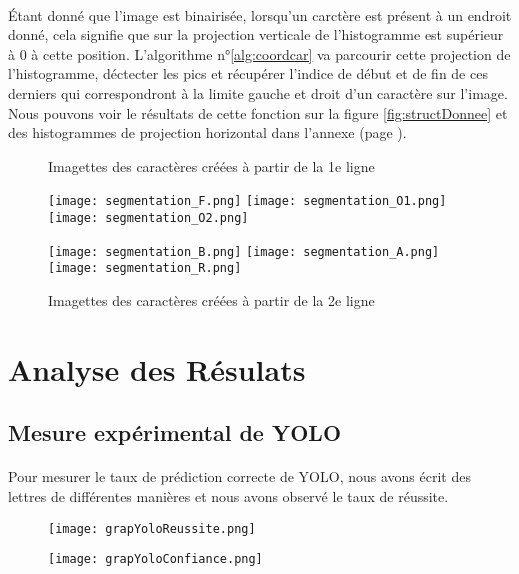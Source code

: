 \documentclass[a4paper]{article}
\begin{document}
			\paragraph{} Étant donné que l'image est binairisée, lorsqu'un carctère est présent à un endroit donné, cela signifie que sur la projection verticale de l'histogramme est supérieur à 0 à cette position. L'algorithme n°\ref{alg:coordcar} va parcourir cette projection de l'histogramme, déctecter les pics et récupérer l'indice de début et de fin de ces derniers qui correspondront à la limite gauche et droit d'un caractère sur l'image. Nous pouvons voir le résultats de cette fonction sur la figure \ref{fig:structDonnee} et des histogrammes de projection horizontal dans l'annexe (page \pageref{fig:histoX1}).
			\begin{figure}[h!]
				\caption{Imagettes des caractères créées à partir de la 1e ligne}
				\texttt{[image: segmentation\_F.png]}
				\centering
				\texttt{[image: segmentation\_O1.png]}
				\centering
				\texttt{[image: segmentation\_O2.png]}
				\centering
				\caption{Imagettes des caractères créées à partir de la 2e ligne}
				\texttt{[image: segmentation\_B.png]}
				\centering
				\texttt{[image: segmentation\_A.png]}
				\centering
				\texttt{[image: segmentation\_R.png]}
				\centering
			\end{figure}
	\newpage
	\section{Analyse des Résulats}
		\subsection{Mesure expérimental de YOLO}
			\paragraph{} Pour mesurer le taux de prédiction correcte de YOLO, nous avons écrit des lettres de différentes manières et nous avons observé le taux de réussite.
			\begin{figure}[H]
				\texttt{[image: grapYoloReussite.png]}
				\centering
				\label{fig:graph:reussite}
			\end{figure}
			\begin{figure}[H]
				\texttt{[image: grapYoloConfiance.png]}
				\centering
				\label{fig:graph:confiance}
			\end{figure}
\end{document}
